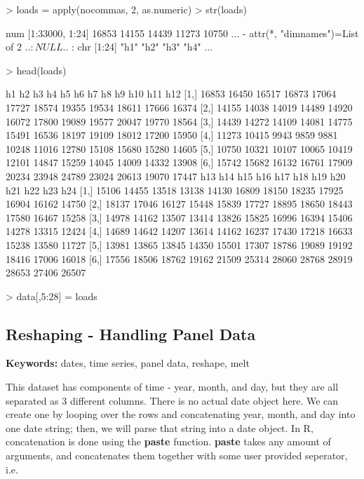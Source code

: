 \documentclass{article}
\begin{document}
\begin{Schunk}
\begin{Sinput}
> loads = apply(nocommas, 2, as.numeric)
> str(loads)
\end{Sinput}
\begin{Soutput}
 num [1:33000, 1:24] 16853 14155 14439 11273 10750 ...
 - attr(*, "dimnames")=List of 2
  ..$ : NULL
  ..$ : chr [1:24] "h1" "h2" "h3" "h4" ...
\end{Soutput}
\begin{Sinput}
> head(loads)
\end{Sinput}
\begin{Soutput}
        h1    h2    h3    h4    h5    h6    h7    h8    h9   h10   h11   h12
[1,] 16853 16450 16517 16873 17064 17727 18574 19355 19534 18611 17666 16374
[2,] 14155 14038 14019 14489 14920 16072 17800 19089 19577 20047 19770 18564
[3,] 14439 14272 14109 14081 14775 15491 16536 18197 19109 18012 17200 15950
[4,] 11273 10415  9943  9859  9881 10248 11016 12780 15108 15680 15280 14605
[5,] 10750 10321 10107 10065 10419 12101 14847 15259 14045 14009 14332 13908
[6,] 15742 15682 16132 16761 17909 20234 23948 24789 23024 20613 19070 17447
       h13   h14   h15   h16   h17   h18   h19   h20   h21   h22   h23   h24
[1,] 15106 14455 13518 13138 14130 16809 18150 18235 17925 16904 16162 14750
[2,] 18137 17046 16127 15448 15839 17727 18895 18650 18443 17580 16467 15258
[3,] 14978 14162 13507 13414 13826 15825 16996 16394 15406 14278 13315 12424
[4,] 14689 14642 14207 13614 14162 16237 17430 17218 16633 15238 13580 11727
[5,] 13981 13865 13845 14350 15501 17307 18786 19089 19192 18416 17006 16018
[6,] 17556 18506 18762 19162 21509 25314 28060 28768 28919 28653 27406 26507
\end{Soutput}
\begin{Sinput}
> data[,5:28] = loads
\end{Sinput}
\end{Schunk}

\subsection{Reshaping - Handling Panel Data}
\textbf{Keywords:} dates, time series, panel data, reshape, melt

This dataset has components of time - year, month, and day, but they are all
separated as 3 different columns.  There is no actual date object here.
We can create one by looping over the rows and concatenating year, month, and day
into one date string; then, we will parse that string into a date object.  In R,
concatenation is done using the \textbf{paste} function.  \textbf{paste} takes any
amount of arguments, and concatenates them together with some user provided
seperator, i.e.
\end{document}
